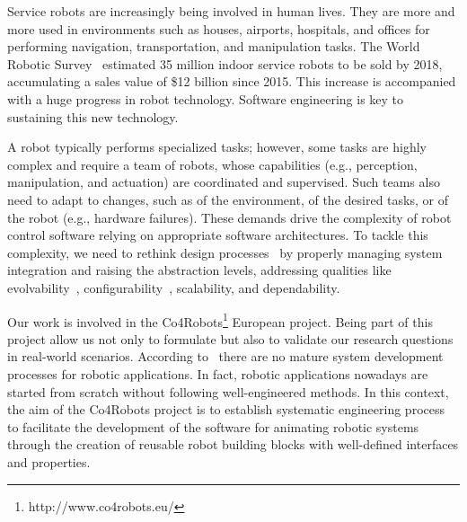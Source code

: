 Service robots are increasingly being involved in human lives. 
They are more and more used in environments such as houses, airports, hospitals, and offices for performing navigation, transportation, and manipulation tasks. 
The World Robotic Survey~\cite{wrs:online} estimated 35 million indoor service robots to be sold by 2018, accumulating a sales value of \$12 billion since 2015. 
This increase is accompanied with a huge progress in robot technology. %
Software engineering is key to sustaining this new technology.

A robot typically performs specialized tasks; however, some tasks are highly complex and require a team of robots, whose capabilities (e.g., perception, manipulation, and actuation) are coordinated and supervised. 
Such teams also need to adapt to changes, such as of the environment, of the desired tasks, or of the robot (e.g., hardware failures). 
These demands drive the complexity of robot control software relying on appropriate software architectures. 
To tackle this complexity, we need to rethink design processes~\cite{Lee2008} by properly managing system integration and raising the abstraction levels, addressing qualities like evolvability~\cite{Perez2008}, configurability~\cite{Gamez2013563}, scalability, and dependability.

Our work is involved in the Co4Robots\footnote{http://www.co4robots.eu/} European project.
Being part of this project allow us not only to formulate but also to validate our research questions in real-world scenarios.
According to~\cite{roadmap} there are no mature system development processes for robotic applications.
In fact, robotic applications nowadays are started from scratch without following well-engineered methods.
In this context, the aim of the Co4Robots project is to establish systematic engineering process to facilitate the development of the software for animating robotic systems through the creation of reusable robot building blocks with well-defined interfaces and properties. 

